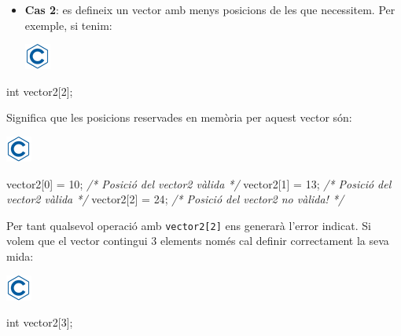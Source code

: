 \documentclass[
]{book}
\newenvironment{Shaded}{\begin{snugshade}}{\end{snugshade}}
\newcommand{\CommentTok}[1]{\textcolor[rgb]{0.56,0.35,0.01}{\textit{#1}}}
\newcommand{\DataTypeTok}[1]{\textcolor[rgb]{0.13,0.29,0.53}{#1}}
\newcommand{\DecValTok}[1]{\textcolor[rgb]{0.00,0.00,0.81}{#1}}
\newcommand{\NormalTok}[1]{#1}
\providecommand{\tightlist}{%
  \setlength{\itemsep}{0pt}\setlength{\parskip}{0pt}}
\begin{document}
\begin{itemize}
\tightlist
\item
  \textbf{Cas 2}: es defineix un vector amb menys posicions de les que necessitem. Per exemple, si tenim:

  \includegraphics{./img/c.png}
\end{itemize}

\begin{Shaded}
\begin{Highlighting}[]
\DataTypeTok{int}\NormalTok{ vector2[}\DecValTok{2}\NormalTok{];}
\end{Highlighting}
\end{Shaded}

Significa que les posicions reservades en memòria per aquest vector són:

\includegraphics{./img/c.png}

\begin{Shaded}
\begin{Highlighting}[]
\NormalTok{vector2[}\DecValTok{0}\NormalTok{] = }\DecValTok{10}\NormalTok{;  }\CommentTok{/* Posició del vector2 vàlida */}
\NormalTok{vector2[}\DecValTok{1}\NormalTok{] = }\DecValTok{13}\NormalTok{;  }\CommentTok{/* Posició del vector2 vàlida */}
\NormalTok{vector2[}\DecValTok{2}\NormalTok{] = }\DecValTok{24}\NormalTok{;  }\CommentTok{/* Posició del vector2 no vàlida! */}
\end{Highlighting}
\end{Shaded}

Per tant qualsevol operació amb \texttt{vector2{[}2{]}} ens generarà l'error indicat. Si volem que el vector contingui 3 elements només cal definir correctament la seva mida:

\includegraphics{./img/c.png}

\begin{Shaded}
\begin{Highlighting}[]
\DataTypeTok{int}\NormalTok{ vector2[}\DecValTok{3}\NormalTok{];}
\end{Highlighting}
\end{Shaded}
\end{document}
